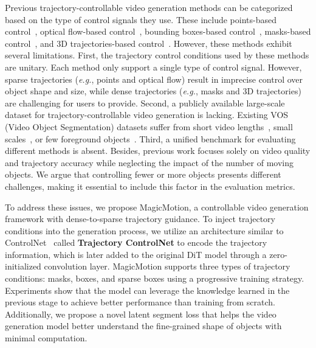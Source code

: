 Previous trajectory-controllable video generation methods can be categorized based on the type of control signals they use. 
These include points-based control~\cite{wang2024motionctrl,wang2025levitor,geng2024motionprompting,zhou2025trackgo}, 
optical flow-based control~\cite{zhang2025tora, burgert2025go, yin2023dragnuwa, li2025image, shi2024motion}, 
bounding boxes-based control~\cite{wang2024boximator, wei2024dreamvideo,yang2024direct, qiu2024freetraj, wu2024motionbooth, jain2023peekaboo,namekata2024sgi2v}, 
masks-based control~\cite{yariv2025through}, 
and 3D trajectories-based control~\cite{fu20243dtrajmaster, gu2025das,wang2025cinemaster}.
However, these methods exhibit several limitations. 
First, the trajectory control conditions used by these methods are unitary. Each method only support a single type of control signal.
However, sparse trajectories (\emph{e.g.}, points and optical flow) result in imprecise control over object shape and size, 
while dense trajectories (\emph{e.g.}, masks and 3D trajectories) are challenging for users to provide.
Second, a publicly available large-scale dataset for trajectory-controllable video generation is lacking. 
Existing VOS (Video Object Segmentation) datasets suffer from short video lengths~\cite{xu2018youtube, miao2021vspw, miao2022large}, small scales~\cite{Perazzi2016, MeViS, MOSE, Hong_2023_ICCV}, or few foreground objects~\cite{fan2021lasot}. 
Third, a unified benchmark for evaluating different methods is absent. Besides, previous work focuses solely on video quality and trajectory accuracy while neglecting the impact of the number of moving objects. We argue that controlling fewer or more objects presents different challenges, making it essential to include this factor in the evaluation metrics.

To address these issues, we propose MagicMotion, a controllable video generation  framework with dense-to-sparse trajectory guidance. To inject trajectory conditions into the generation process, we utilize an architecture similar to ControlNet~\cite{zhang2023adding} called \textbf{Trajectory ControlNet} to encode the trajectory information, which is later added to the original DiT model through a zero-initialized convolution layer.
MagicMotion supports three types of trajectory conditions: masks, boxes, and sparse boxes using a progressive training strategy. Experiments show that the model can leverage the knowledge learned in the previous stage to achieve better performance than training from scratch. 
Additionally, we propose a novel latent segment loss that helps the video generation model better understand the fine-grained shape of objects with minimal computation. 

